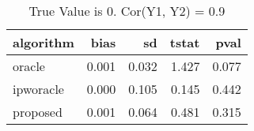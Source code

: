 \begin{table}[h!]
\caption{True Value is 0. Cor(Y1, Y2) = 0.9}
\centering
\begin{tabular}[t]{lrrrr}
\toprule
algorithm & bias & sd & tstat & pval\\
\midrule
oracle & 0.001 & 0.032 & 1.427 & 0.077\\
ipworacle & 0.000 & 0.105 & 0.145 & 0.442\\
proposed & 0.001 & 0.064 & 0.481 & 0.315\\
\bottomrule
\end{tabular}
\end{table}
